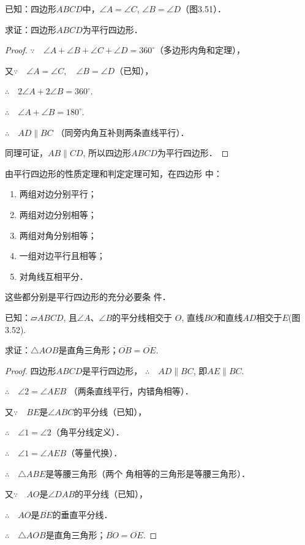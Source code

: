 已知：四边形$ABCD$中，$\angle A=\angle C$, $\angle B=\angle D$（图3.51）．

求证：四边形$ABCD$为平行四边形．

\begin{proof}
$\because\quad \angle A+\angle B+\angle C +\angle D=360^{\circ}$（多边形内角和定理），

又$\because\quad \angle A=\angle C,\quad\angle B=\angle D$（已知），

$\therefore\quad 2\angle A+2\angle B=360^{\circ}$.

$\therefore\quad \angle A+\angle B=180^{\circ}$.

$\therefore\quad AD\parallel BC$ （同旁内角互补则两条直线平行）．

同理可证，$AB\parallel CD$, 所以四边形$ABCD$为平行四边形．
\end{proof}

由平行四边形的性质定理和判定定理可知，在四边形
中：
\begin{enumerate}
    \item 两组对边分别平行；
    \item 两组对边分别相等；
    \item 两组对角分别相等；
    \item 一组对边平行且相等；
    \item 对角线互相平分．
\end{enumerate}
这些都分别是平行四边形的充分必要条
件．

\begin{example}
     已知：$\parallelogram ABCD$, 且$\angle A$、$\angle B$的平分线相交于
$O$, 直线$BO$和直线$AD$相交于$E$(图3.52).

求证：$\triangle AOB$是直角三角形；$\overline{OB}=\overline{OE}$.
\end{example}

\begin{proof}
四边形$ABCD$是平行四边形，
$\therefore\quad AD\parallel BC$, 即$AE\parallel BC$.

$\therefore\quad \angle 2=\angle AEB$ （两条直线平行，内错角相等）．

又$\because\quad BE$是$\angle ABC$的平分线（已知），

$\therefore\quad \angle 1=\angle 2$（角平分线定义）．

$\therefore\quad \angle 1=\angle AEB$（等量代换）．

$\therefore\quad \triangle ABE$是等腰三角形（两个
角相等的三角形是等腰三角形）．

又$\because\quad AO$是$\angle DAB$的平分线（已知），

$\therefore\quad AO$是$\overline{BE}$的垂直平分线．

$\therefore\quad \triangle AOB$是直角三角形；$\overline{BO}=\overline{OE}$.
\end{proof}

